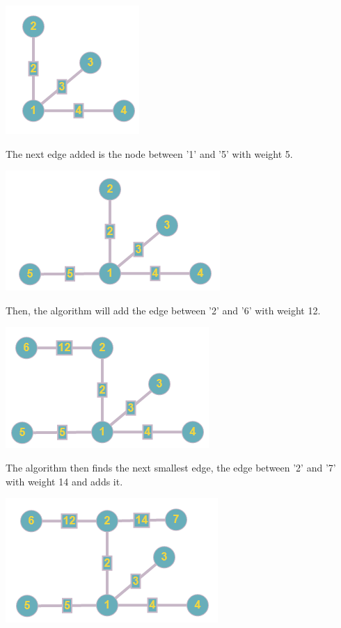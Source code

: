 \documentclass{article}
\begin{document}
\newline
\begin{center}
\includegraphics{b233}
\end{center}
The next edge added is the node between '1' and '5' with weight 5.
\newline
\begin{center}
\includegraphics{b234}
\end{center}
Then, the algorithm will add the edge between '2' and '6' with weight 12.
\newline
\begin{center}
\includegraphics{b235}
\end{center}
The algorithm then finds the next smallest edge, the edge between '2' and '7' with weight 14 and adds it.
\newline
\begin{center}
\includegraphics{b236}
\end{center}
\end{document}
